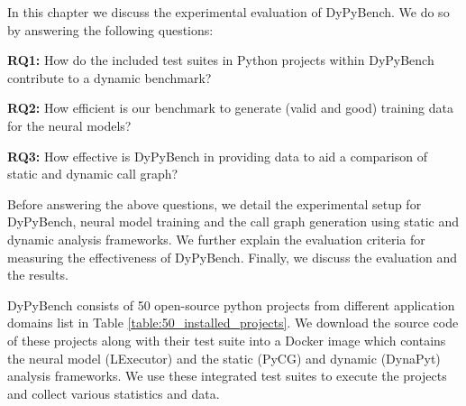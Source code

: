 In this chapter we discuss the experimental evaluation of DyPyBench. We do so by answering the following questions:

\textbf{RQ1:} How do the included test suites in Python projects within DyPyBench contribute to a dynamic benchmark?

\textbf{RQ2:} How efficient is our benchmark to generate (valid and good) training data for the neural models?

\textbf{RQ3:} How effective is DyPyBench in providing data to aid a comparison of static and dynamic call graph?

Before answering the above questions, we detail the experimental setup for DyPyBench, neural model training and the call graph generation using static and dynamic analysis frameworks.
We further explain the evaluation criteria for measuring the effectiveness of DyPyBench.
Finally, we discuss the evaluation and the results.

DyPyBench consists of 50 open-source python projects from different application domains list in Table \ref{table:50_installed_projects}.
We download the source code of these projects along with their test suite into a Docker image which contains the neural model (LExecutor) and the static (PyCG) and dynamic (DynaPyt) analysis frameworks.
We use these integrated test suites to execute the projects and collect various statistics and data.

